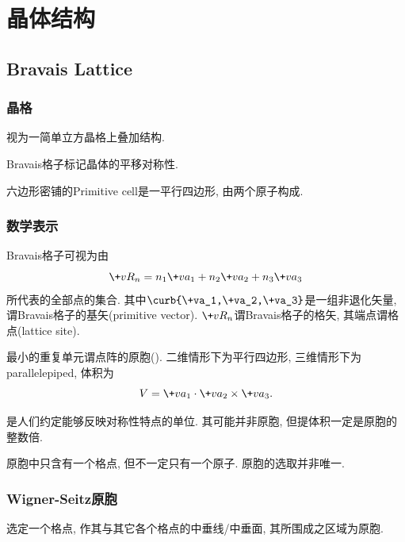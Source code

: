 \documentclass[hidelinks]{ctexart}
\begin{document}
\section{晶体结构} %
\label{sec:晶体结构}

\subsection{Bravais Lattice} %
\label{sub:bravais_lattice}

\subsubsection{晶格} %
\label{ssub:晶格}

\begin{ex}
    视为一简单立方晶格上叠加结构.
\end{ex}
Bravais格子标记晶体的平移对称性.
\begin{ex}
    六边形密铺的Primitive cell是一平行四边形, 由两个原子构成.
\end{ex}


\subsubsection{数学表示} %
\label{ssub:数学表示}

Bravais格子可视为由
\[ \+vR_n = n_1 \+va_1 + n_2 \+va_2 + n_3 \+va_3 \]
所代表的全部点的集合. 其中$\curb{\+va_1,\+va_2,\+va_3}$是一组非退化矢量, 谓Bravais格子的基矢(primitive vector). $\+vR_n$谓Bravais格子的格矢, 其端点谓格点(lattice site).
\par
最小的重复单元谓点阵的原胞(). 二维情形下为平行四边形, 三维情形下为parallelepiped, 体积为
\[ V = \+va_1 \cdot \+va_2 \times \+va_3. \]
\par
{}是人们约定能够反映对称性特点的单位. 其可能并非原胞, 但提体积一定是原胞的整数倍.
\par
原胞中只含有一个格点, 但不一定只有一个原子. 原胞的选取并非唯一.


\subsubsection{Wigner-Seitz原胞} %
\label{ssub:wigner_seitz原胞}

选定一个格点, 作其与其它各个格点的中垂线/中垂面, 其所围成之区域为原胞.
\end{document}
